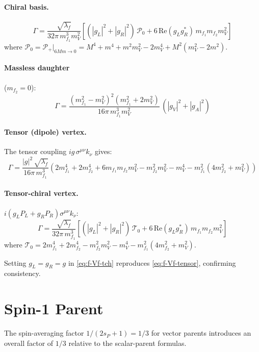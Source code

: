 \documentclass[11pt,a4paper]{article}
\newcommand{\la}{\lambda}
\newcommand{\beq}{\begin{equation}}
\newcommand{\eeq}{\end{equation}}
\newcommand{\conj}[1]{#1^{*}}
\begin{document}
\paragraph{Chiral basis.}
\beq
\Gamma = \frac{\sqrt{\la_f}}{32\pi\, m_{f_1}^3 m_V^2}
\left[(|g_L|^2+|g_R|^2)\,\mathcal{P}_0 + 6\,\mathrm{Re}(g_L\conj{g_R})\,m_{f_1} m_{f_2} m_V^2\right]
\label{eq:f-Vf-ch}
\eeq
where $\mathcal{P}_0 = \mathcal{P}_+|_{6Mm\to 0} = M^4+m^4+m^2 m_V^2-2m_V^4+M^2(m_V^2-2m^2)$.

\paragraph{Massless daughter} ($m_{f_2}=0$):
\beq
\Gamma = \frac{(m_{f_1}^2-m_V^2)^2(m_{f_1}^2+2m_V^2)}{16\pi\, m_{f_1}^3 m_V^2}\,(|g_V|^2+|g_A|^2)
\label{eq:f-Vf-massless}
\eeq

\paragraph{Tensor (dipole) vertex.}
The tensor coupling $ig\,\sigma^{\mu\nu}k_\nu$ gives:
\beq
\boxed{
\Gamma = \frac{|g|^2\,\sqrt{\la_f}}{16\pi\, m_{f_1}^3}
\left(2m_{f_1}^4+2m_{f_2}^4+6m_{f_1} m_{f_2} m_V^2-m_{f_2}^2 m_V^2-m_V^4-m_{f_1}^2(4m_{f_2}^2+m_V^2)\right)
}
\label{eq:f-Vf-tensor}
\eeq

\paragraph{Tensor-chiral vertex.}
$i(g_L P_L + g_R P_R)\sigma^{\mu\nu}k_\nu$:
\beq
\Gamma = \frac{\sqrt{\la_f}}{32\pi\, m_{f_1}^3}
\left[(|g_L|^2+|g_R|^2)\,\mathcal{T}_0 + 6\,\mathrm{Re}(g_L\conj{g_R})\,m_{f_1} m_{f_2} m_V^2\right]
\label{eq:f-Vf-tch}
\eeq
where $\mathcal{T}_0 = 2m_{f_1}^4+2m_{f_2}^4-m_{f_2}^2 m_V^2-m_V^4-m_{f_1}^2(4m_{f_2}^2+m_V^2)$.

Setting $g_L=g_R=g$ in \eqref{eq:f-Vf-tch} reproduces \eqref{eq:f-Vf-tensor}, confirming consistency.

\section{Spin-1 Parent}
\label{sec:spin1}

The spin-averaging factor $1/(2s_P+1) = 1/3$ for vector parents introduces an overall factor of
$1/3$ relative to the scalar-parent formulas.
\end{document}
